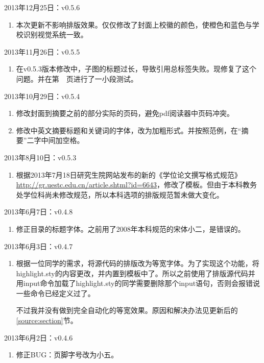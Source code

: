 \noindent
2013年12月25日：v0.5.6
\begin{enumerate}
\item 本次更新不影响排版效果。仅仅修改了封面上校徽的颜色，使橙色和蓝色与学校识别视觉系统一致。
\end{enumerate}

\noindent
2013年11月26日：v0.5.5
\begin{enumerate}
\item 在v0.5.3版本修改中，子图的标题过长，导致引用总标签失败。现修复了这个问题。并在第~\pageref{testpicslabel}~页进行了一小段测试。
\end{enumerate}

\noindent
2013年10月29日：v0.5.4
\begin{enumerate}
\item 修改封面到摘要之前的部分实际的页码，避免pdf阅读器中页码冲突。
\item 修改中英文摘要标题和关键词的字体，改为加粗形式。并按照范例，在“摘要”二字中间加空格。
\end{enumerate}

\noindent
2013年8月10日：v0.5.3
\begin{enumerate}
\item 根据2013年7月18日研究生院网站发布的新的《学位论文撰写格式规范》\url{http://gr.uestc.edu.cn/article.shtml?id=6643}，修改了模板。但由于本科教务处学位科尚未修改规范，所以本科选项的排版规范暂未做大变化。
\end{enumerate}

\noindent
2013年6月7日：v0.4.8
\begin{enumerate}
\item 修正目录的标题字体。之前用了2008年本科规范的宋体小二，是错误的。
\end{enumerate}

\noindent
2013年6月3日：v0.4.7
\begin{enumerate}
\item 根据一位同学的需求，将源代码的排版改为等宽字体。为了实现这个功能，将highlight.sty的内容更改，并内置到模板中了。所以之前使用了排版源代码并用input命令加载了highlight.sty的同学需要删除那个input语句，否则会报错说一些命令已经定义过了。

    不过我并没有做到完全自动化的等宽效果。原因和解决办法见更新后的\ref{source:section}节。
\end{enumerate}

\noindent
2013年6月2日：v0.4.6
\begin{enumerate}
\item 修正BUG：页脚字号改为小五。
\end{enumerate}

